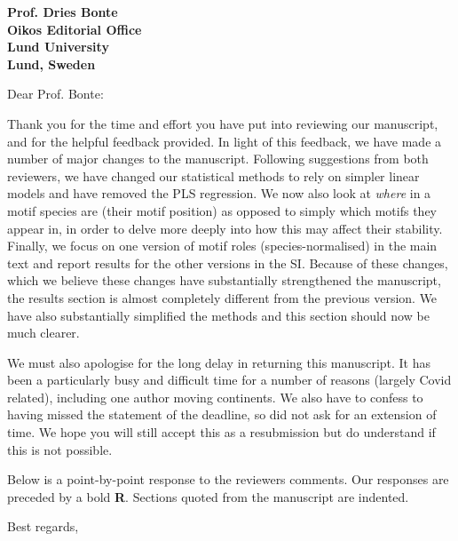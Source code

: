 \documentclass[12pt]{letter}
\begin{document}
\begin{letter}{\bf Prof. Dries Bonte\\
Oikos Editorial Office \\
Lund University \\
Lund, Sweden}


\opening{Dear Prof. Bonte:}

    Thank you for the time and effort you have put into reviewing our manuscript, and for the helpful feedback provided. 
    In light of this feedback, we have made a number of major changes to the manuscript. 
    Following suggestions from both reviewers, we have changed our statistical methods to rely on simpler linear models and have removed the PLS regression. 
    We now also look at \emph{where} in a motif species are (their motif position) as opposed to simply which motifs they appear in, in order to delve more deeply into how this may affect their stability. 
    Finally, we focus on one version of motif roles (species-normalised) in the main text and report results for the other versions in the SI.
    Because of these changes, which we believe these changes have substantially strengthened the manuscript, the results section is almost completely different from the previous version.
    We have also substantially simplified the methods and this section should now be much clearer. 


    We must also apologise for the long delay in returning this manuscript. It has been a particularly busy and difficult time for a number of reasons (largely Covid related), including one author moving continents. We also have to confess to having missed the statement of the deadline, so did not ask for an extension of time. We hope you will still accept this as a resubmission but do understand if this is not possible. 

    
    Below is a point-by-point response to the reviewers comments. Our responses  are preceded by a bold \textbf{R}. Sections quoted from the manuscript are indented.


    \closing{Best regards,}

    \clearpage



\end{letter}
\end{document}
